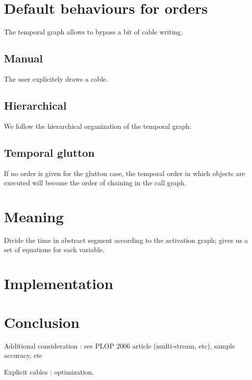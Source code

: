 \documentclass{article}
\begin{document}
    
    
    \section{Default behaviours for orders}
    The temporal graph allows to bypass a bit of cable writing.
    
    \subsection{Manual}
    The user explicitely draws a cable.
    
    \subsection{Hierarchical}
    We follow the hierarchical organization of the temporal graph.
    
    
    \subsection{Temporal glutton}
    If no order is given for the glutton case, the temporal order in which objects are executed
    will become the order of chaining in the call graph.
    
	\section{Meaning}
	Divide the time in abstract segment according to the activation graph; gives us a set of equations for each variable.
	\section{Implementation}
    \section{Conclusion}
    Additional consideration : see PLOP 2006 article (multi-stream, etc), sample accuracy, etc
    
    Explicit cables : optimization.
\end{document}
